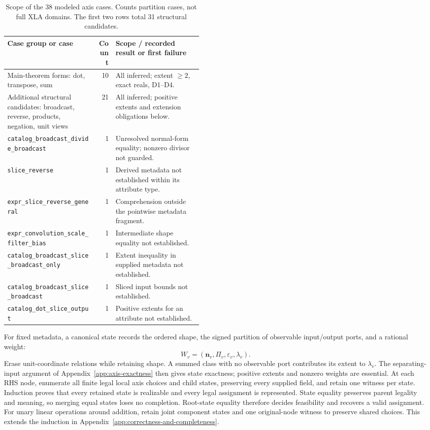 \begin{table}[!htbp]
\caption{Scope of the 38 modeled axis cases. Counts partition cases, not
full XLA domains. The first two rows total 31 structural candidates.}
\label{tab:xla-theorem-scope}
\small
\setlength{\tabcolsep}{4pt}
\begin{tabularx}{\linewidth}{@{}p{0.46\linewidth}rY@{}}\toprule
Case group or case & Count & Scope / recorded result or first failure\\\midrule
Main-theorem forms: dot, transpose, sum & 10
& All inferred; extent $\ge2$, exact reals, D1--D4.\\
Additional structural candidates: broadcast, reverse, products, negation, unit views & 21
& All inferred; positive extents and extension obligations below.\\
\nolinkurl{catalog_broadcast_divide_broadcast} & 1
& Unresolved normal-form equality; nonzero divisor not guarded.\\\midrule
\nolinkurl{slice_reverse} & 1
& Derived metadata not established within its attribute type.\\
\nolinkurl{expr_slice_reverse_general} & 1
& Comprehension outside the pointwise metadata fragment.\\
\nolinkurl{expr_convolution_scale_filter_bias} & 1
& Intermediate shape equality not established.\\
\nolinkurl{catalog_broadcast_slice_broadcast_only} & 1
& Extent inequality in supplied metadata not established.\\
\nolinkurl{catalog_broadcast_slice_broadcast} & 1
& Sliced input bounds not established.\\
\nolinkurl{catalog_dot_slice_output} & 1
& Positive extents for an attribute not established.\\\bottomrule
\end{tabularx}
\end{table}

For fixed metadata, a canonical state records the ordered shape, the signed
partition of observable input/output ports, and a rational weight:
\[
 W_v=(\mathbf n_v,\Pi_v,\varepsilon_v,\lambda_v).
\]
Erase unit-coordinate relations while retaining shape. A summed class with
no observable port contributes its extent to $\lambda_v$.
The separating-input argument of Appendix~\ref{app:axis-exactness} then gives
state exactness; positive extents and nonzero weights are essential.
At each RHS node, enumerate all finite legal local axis choices and child
states, preserving every supplied field, and retain one witness per state.
Induction proves that every retained state is realizable and every legal
assignment is represented. State equality preserves parent legality and
meaning, so merging equal states loses no completion. Root-state equality
therefore decides feasibility and recovers a valid assignment. For unary
linear operations around addition, retain joint component states and one
original-node witness to preserve shared choices. This extends the induction
in Appendix~\ref{app:correctness-and-completeness}.

